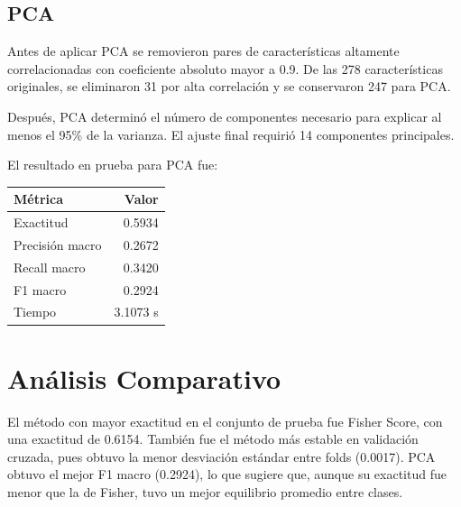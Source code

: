 \documentclass{article}
\begin{document}
\subsection{PCA}

Antes de aplicar PCA se removieron pares de características altamente correlacionadas con coeficiente absoluto mayor a 0.9. De las 278 características originales, se eliminaron 31 por alta correlación y se conservaron 247 para PCA.

Después, PCA determinó el número de componentes necesario para explicar al menos el 95\% de la varianza. El ajuste final requirió 14 componentes principales.

El resultado en prueba para PCA fue:

\begin{center}
\begin{tabular}{lr}
\toprule
Métrica & Valor \\
\midrule
Exactitud & 0.5934 \\
Precisión macro & 0.2672 \\
Recall macro & 0.3420 \\
F1 macro & 0.2924 \\
Tiempo & 3.1073 s \\
\bottomrule
\end{tabular}
\end{center}

\section{Análisis Comparativo}

\begin{center}
\end{center}

El método con mayor exactitud en el conjunto de prueba fue Fisher Score, con una exactitud de 0.6154. También fue el método más estable en validación cruzada, pues obtuvo la menor desviación estándar entre folds (0.0017). PCA obtuvo el mejor F1 macro (0.2924), lo que sugiere que, aunque su exactitud fue menor que la de Fisher, tuvo un mejor equilibrio promedio entre clases.
\end{document}
